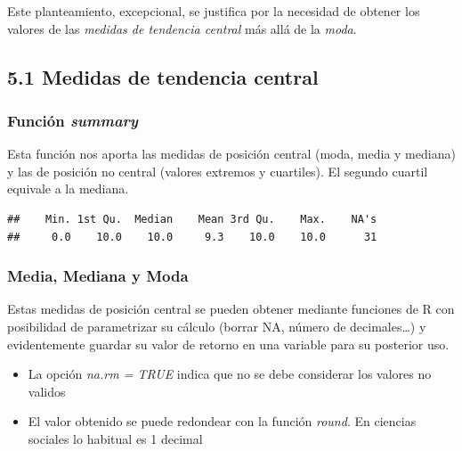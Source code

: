 \documentclass[
  12 pt,
  a4paper,
]{article}
\newenvironment{Shaded}{\begin{snugshade}}{\end{snugshade}}
\newcommand{\AttributeTok}[1]{\textcolor[rgb]{0.13,0.29,0.53}{#1}}
\newcommand{\CommentTok}[1]{\textcolor[rgb]{0.56,0.35,0.01}{\textit{#1}}}
\newcommand{\DecValTok}[1]{\textcolor[rgb]{0.00,0.00,0.81}{#1}}
\newcommand{\FunctionTok}[1]{\textcolor[rgb]{0.13,0.29,0.53}{\textbf{#1}}}
\newcommand{\NormalTok}[1]{#1}
\newcommand{\SpecialCharTok}[1]{\textcolor[rgb]{0.81,0.36,0.00}{\textbf{#1}}}
\providecommand{\tightlist}{%
  \setlength{\itemsep}{0pt}\setlength{\parskip}{0pt}}
\begin{document}
Este planteamiento, excepcional, se justifica por la necesidad de
obtener los valores de las \emph{medidas de tendencia central} más allá
de la \emph{moda}.

\hypertarget{medidas-de-tendencia-central}{%
\subsection{5.1 Medidas de tendencia
central}\label{medidas-de-tendencia-central}}

\hypertarget{funciuxf3n-summary}{%
\subsubsection{\texorpdfstring{Función
\emph{summary}}{Función summary}}\label{funciuxf3n-summary}}

Esta función nos aporta las medidas de posición central (moda, media y
mediana) y las de posición no central (valores extremos y cuartiles). El
segundo cuartil equivale a la mediana.

\begin{Shaded}
\end{Shaded}

\begin{verbatim}
##    Min. 1st Qu.  Median    Mean 3rd Qu.    Max.    NA's 
##     0.0    10.0    10.0     9.3    10.0    10.0      31
\end{verbatim}

\hypertarget{media-mediana-y-moda}{%
\subsubsection{Media, Mediana y Moda}\label{media-mediana-y-moda}}

Estas medidas de posición central se pueden obtener mediante funciones
de R con posibilidad de parametrizar su cálculo (borrar NA, número de
decimales\ldots) y evidentemente guardar su valor de retorno en una
variable para su posterior uso.

\begin{itemize}
\tightlist
\item
  La opción \emph{na.rm = TRUE} indica que no se debe considerar los
  valores no validos
\item
  El valor obtenido se puede redondear con la función \emph{round}. En
  ciencias sociales lo habitual es 1 decimal
\end{itemize}
\end{document}
